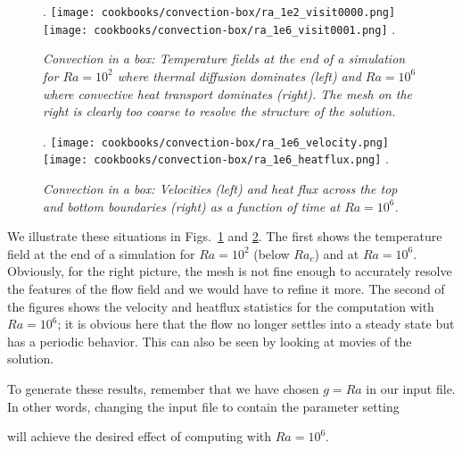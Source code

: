 \documentclass{article}
\begin{document}
\begin{figure}
\phantom.
\hfill
\texttt{[image: cookbooks/convection-box/ra\_1e2\_visit0000.png]}
\hfill
\texttt{[image: cookbooks/convection-box/ra\_1e6\_visit0001.png]}
\hfill
\phantom.
\caption{\it Convection in a box: Temperature fields at the end of a
simulation for $Ra=10^2$ where thermal diffusion dominates (left) and $Ra=10^6$
where convective heat transport dominates (right).
The mesh on the right is clearly too coarse to resolve the structure of the solution.}
\label{fig:convection-box-fields-different-Ra}
\end{figure}

\begin{figure}
\phantom.
\hfill
\texttt{[image: cookbooks/convection-box/ra\_1e6\_velocity.png]}
\hfill
\texttt{[image: cookbooks/convection-box/ra\_1e6\_heatflux.png]}
\hfill
\phantom.
\caption{\it Convection in a box: Velocities (left) and heat flux across the
top and bottom boundaries (right) as a function of time at $Ra=10^6$.}
\label{fig:convection-box-stats-different-Ra}
\end{figure}

We illustrate these situations in
Figs.~\ref{fig:convection-box-fields-different-Ra} and
\ref{fig:convection-box-stats-different-Ra}. The first shows the temperature
field at the end of a simulation for $Ra=10^2$ (below $Ra_c$) and at $Ra=10^6$.
Obviously, for the right picture, the mesh is not fine enough to accurately
resolve the features of the flow field and we would have to refine it more. The
second of the figures shows the velocity and heatflux statistics for the
computation with $Ra=10^6$; it is obvious here that the flow no longer settles
into a steady state but has a periodic behavior. This can also be seen by
looking at movies of the solution.

To generate these results, remember that we have chosen 
$g=Ra$ in our input file. In other words, changing the input file to
contain the parameter setting
%

%
will achieve the desired effect of computing with $Ra=10^6$.
\end{document}

